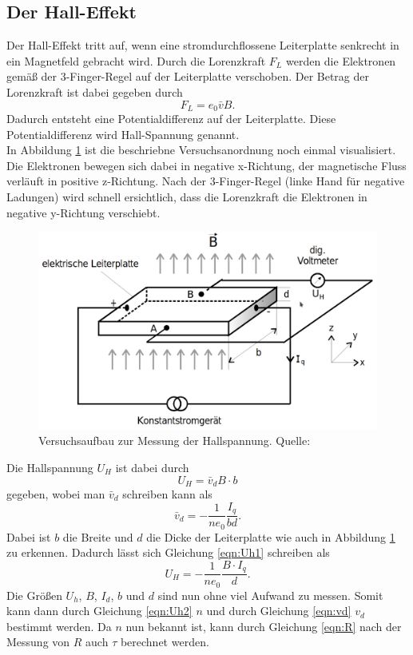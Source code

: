 \subsection{Der Hall-Effekt}
Der Hall-Effekt tritt auf, wenn eine stromdurchflossene Leiterplatte senkrecht in ein Magnetfeld 
gebracht wird. Durch die Lorenzkraft $F_L$ werden die Elektronen gemäß der 3-Finger-Regel auf der Leiterplatte
verschoben. Der Betrag der Lorenzkraft ist dabei gegeben durch
\begin{equation*}
    F_L=e_0\bar{v}B.
\end{equation*} 
Dadurch entsteht eine Potentialdifferenz auf der Leiterplatte. Diese Potentialdifferenz wird 
Hall-Spannung genannt. \\
In Abbildung \ref{fig:Hall} ist die beschriebne Versuchsanordnung noch einmal visualisiert.
Die Elektronen bewegen sich dabei in negative x-Richtung, der magnetische Fluss verläuft in positive z-Richtung.
Nach der 3-Finger-Regel (linke Hand für negative Ladungen) wird schnell ersichtlich, dass die Lorenzkraft die 
Elektronen in negative y-Richtung verschiebt.
%
\begin{figure}[H]
    \centering
    \includegraphics[scale = 0.3]{content/1Hall.png}
    \caption{Versuchsaufbau zur Messung der Hallspannung. Quelle: \cite{AP01}}
    \label{fig:Hall}
  \end{figure}
%
\noindent Die Hallspannung $U_H$ ist dabei durch
\begin{equation}
    U_H=\bar{v}_dB\cdot b \label{eqn:Uh1}
\end{equation}
gegeben, wobei man $\bar{v}_d$ schreiben kann als 
\begin{equation}
    \bar{v}_d=-\frac{1}{ne_0}\frac{I_q}{bd}. \label{eqn:vd}
\end{equation}
Dabei ist $b$ die Breite und $d$ die Dicke der Leiterplatte wie auch in Abbildung \ref{fig:Hall} zu erkennen.
Dadurch lässt sich Gleichung \eqref{eqn:Uh1} schreiben als 
\begin{equation}
    U_H=-\frac{1}{ne_0}\frac{B\cdot I_q}{d}. \label{eqn:Uh2}
\end{equation}
Die Größen $U_h$, $B$, $I_d$, $b$ und $d$ sind nun ohne viel Aufwand zu messen. Somit kann dann durch 
Gleichung \ref{eqn:Uh2} $n$ und durch Gleichung \ref{eqn:vd} $v_d$ bestimmt werden. Da $n$ nun bekannt ist,
kann durch Gleichung \ref{eqn:R} nach der Messung von $R$ auch $\tau$ berechnet werden.\\
